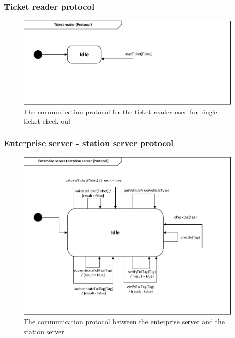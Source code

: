 \subsubsection*{Ticket reader protocol}
\begin{figure}[H]
\centering
\includegraphics[width=0.7\linewidth]{img/behaviour_state_machines/protocol_state_machines/protocol_state_machine_ticket_reader}
\caption{The communication protocol for the ticket reader used for single ticket check out}
\label{fig:protocol_state_machine_ticket_reader}
\end{figure}

\subsubsection*{Enterprise server - station server protocol}
\begin{figure}[H]
\centering
\includegraphics[width=0.7\linewidth]{img/behaviour_state_machines/protocol_state_machines/protocol_state_machine_enterprise_server_to_station_server}
\caption{The communication protocol between the enterprise server and the station server}
\label{fig:protocol_state_machine_enterprise_server_to_station_server}
\end{figure}

